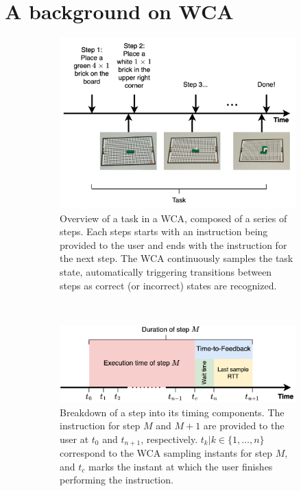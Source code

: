 \section{A background on \acs*{WCA}}\label{sec:background}

\begin{figure}
    \centering
    \begin{subfigure}{\columnwidth}
        \centering
        \includegraphics[width=\columnwidth]{figs/task.png}
        \caption{%
            Overview of a task in a \ac{WCA}, composed of a series of steps.
            Each steps starts with an instruction being provided to the user and ends with the instruction for the next step.
            The \ac{WCA} continuously samples the task state, automatically triggering transitions between steps as correct (or incorrect) states are recognized.
        }\label{fig:task}
    \end{subfigure}\\
    \begin{subfigure}{\columnwidth}
        \centering
        \includegraphics[width=\columnwidth]{figs/step_time.png}
        \caption{%
            Breakdown of a step into its timing components.
            The instruction for step \( M \) and \( M + 1 \) are provided to the user at \( t_0 \) and \( t_{n+1} \), respectively.
            \( t_k | k \in \{1, \ldots, n \} \) correspond to the \ac{WCA} sampling instants for step \( M \), and \( t_c \) marks the instant at which the user finishes performing the instruction.
        }\label{fig:step}
    \end{subfigure}
    \caption{}
\end{figure}

